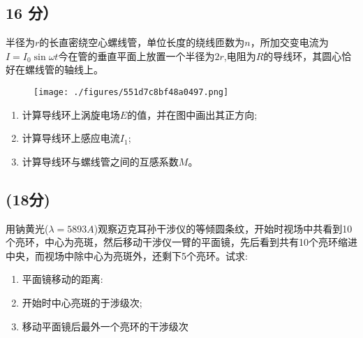 \subsection{16 分）}
半径为$r$的长直密绕空心螺线管，单位长度的绕线匝数为$n$，所加交变电流为$I = I_0 \sin \omega t$今在管的垂直平面上放置一个半径为$2r$,电阻为$R$的导线环，其圆心恰好在螺线管的轴线上。
\begin{figure}[ht]
\centering
\texttt{[image: ./figures/551d7c8bf48a0497.png]}
\caption{} \label{fig_PKU200_3}
\end{figure}
\begin{enumerate}
\item 计算导线环上涡旋电场$E$的值，并在图中画出其正方向;
\item 计算导线环上感应电流$I_1$;
\item 计算导线环与螺线管之间的互感系数$M$。
\end{enumerate}
\subsection{(18分)}
用钠黄光($\lambda =5893A$)观察迈克耳孙干涉仪的等倾圆条纹，开始时视场中共看到10个亮环，中心为亮斑，然后移动干涉仪一臂的平面镜，先后看到共有10个亮环缩进中央，而视场中除中心为亮斑外，还剩下5个亮环。试求:
\begin{enumerate}
\item 平面镜移动的距离:
\item 开始时中心亮斑的于涉级次;
\item 移动平面镜后最外一个亮环的干涉级次
\end{enumerate}
